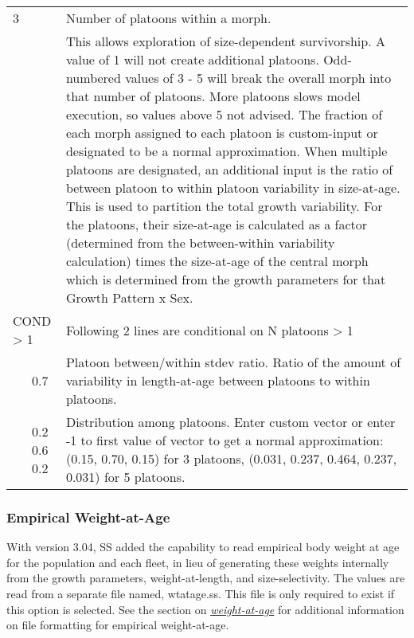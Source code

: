\begin{center}
\begin{longtable}{p{0.5cm} p{2cm} p{12cm}}
		\hline
		3 & & Number of platoons within a morph.\Tstrut\\
		& & This allows exploration of size-dependent survivorship. A value of 1 will not create additional platoons.  Odd-numbered values of 3 - 5 will break the overall morph into that number of platoons.  More platoons slows model execution, so values above 5 not advised.  The fraction of each morph assigned to each platoon is custom-input or designated to be a normal approximation.  When multiple platoons are designated, an additional input is the ratio of between platoon to within platoon variability in size-at-age.  This is used to partition the total growth variability.  For the platoons, their size-at-age is calculated as a factor (determined from the between-within variability calculation) times the size-at-age of the central morph which is determined from the growth parameters for that Growth Pattern x Sex. \Bstrut\\

		\multicolumn{2}{l}{COND > 1}& \multicolumn{1}{l}{\parbox{12cm}{Following 2 lines are conditional on N platoons > 1}} \Tstrut\Bstrut\\

		& 0.7 & Platoon between/within stdev ratio. Ratio of the amount of variability in length-at-age between platoons to within platoons.\Bstrut\\

		& 0.2 0.6 0.2 & Distribution among platoons. Enter custom vector or enter -1 to first value of vector to get a normal approximation: (0.15, 0.70, 0.15) for 3 platoons, (0.031, 0.237, 0.464, 0.237, 0.031) for 5 platoons.\Bstrut\\
		\hline
	\end{longtable}
\end{center}

\subsubsection{Empirical Weight-at-Age}
With version 3.04, SS added the capability to read empirical body weight at age for the population and each fleet, in lieu of generating these weights internally from the growth parameters, weight-at-length, and size-selectivity.  The values are read from a separate file named, wtatage.ss.  This file is only required to exist if this option is selected.  See the section on \hyperlink{WAA}{\textit{weight-at-age}} for additional information on file formatting for empirical weight-at-age.


